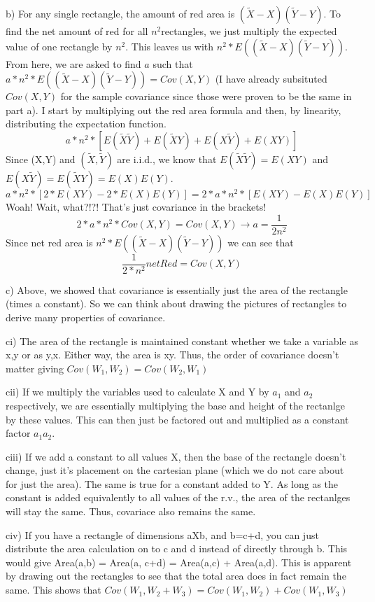 \documentclass[11pt]{article}
\begin{document}
	b) For any single rectangle, the amount of red area is $(\tilde{X}-X)(\tilde{Y}-Y)$.  To find the net amount of red for all $n^2$rectangles, we just multiply the expected value of one rectangle by $n^2$.  This leaves us with $n^2*E((\tilde{X}-X)(\tilde{Y}-Y))$. 
	From here, we are asked to find $a$ such that $a*n^2*E((\tilde{X}-X)(\tilde{Y}-Y)) = Cov(X,Y)$ (I have already subsituted $Cov(X,Y)$ for the sample covariance since those were proven to be the same in part a).  
	I start by multiplying out the red area formula and then, by linearity, distributing the expectation function.  
	$$ a*n^2*[E(\tilde{X}\tilde{Y}) + E(\tilde{X}Y) +E(X\tilde{Y}) +E(XY)]$$
	Since (X,Y) and $(\tilde{X},\tilde{Y})$ are i.i.d., we know that $ E(\tilde{X}\tilde{Y}) = E(XY)$ and $E(X\tilde{Y})=E(\tilde{X}Y)=E(X)E(Y)$.
	$$ a*n^2*[2*E(XY)-2*E(X)E(Y)]=2*a*n^2*[E(XY)-E(X)E(Y)]$$
	Woah! Wait, what?!?! That's just covariance in the brackets! 
	$$ 2*a*n^2*Cov(X,Y) = Cov(X,Y) \rightarrow a = \frac{1}{2n^2}$$
	Since net red area is $n^2*E((\tilde{X}-X)(\tilde{Y}-Y))$ we can see that 
	$$ \frac{1}{2*n^2}netRed = Cov(X,Y)$$

\smallskip
	c) Above, we showed that covariance is essentially just the area of the rectangle (times a constant).  So we can think about drawing the pictures of rectangles to derive many properties of covariance.
\smallskip

	ci) The area of the rectangle is maintained constant whether we take a variable as x,y or as y,x. Either way, the area is xy.  Thus, the order of covariance doesn't matter giving $Cov(W_1,W_2) = Cov(W_2, W_1)$
\smallskip

	cii) If we multiply the variables used to calculate X and Y by $a_1$ and $a_2$ respectively, we are essentially multiplying the base and height of the rectanlge by these values.  This can then just be factored out and multiplied as a constant factor $a_1a_2$.
\smallskip

	ciii) If we add a constant to all values X, then the base of the rectangle doesn't change, just it's placement on the cartesian plane (which we do not care about for just the area).  The same is true for a constant added to Y.  As long as the constant is added equivalently to all values of the r.v., the area of the rectanlges will stay the same.  Thus, covariace also remains the same. 

\smallskip

	civ) If you have a rectangle of dimensions aXb, and b=c+d, you can just distribute the area calculation on to c and d instead of directly through b.  This would give Area(a,b) = Area(a, c+d) = Area(a,c) + Area(a,d). This is apparent by drawing out the rectangles to see that the total area does in fact remain the same. This shows that $Cov(W_1,W_2+W_3) = Cov(W_1,W_2) + Cov(W_1,W_3)$
\end{document}
